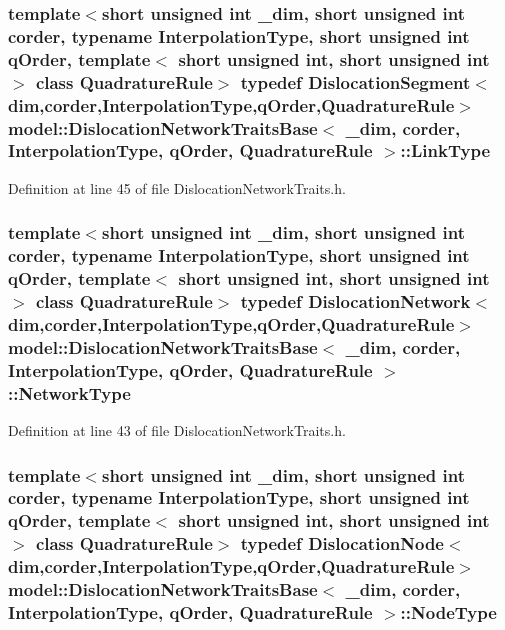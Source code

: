 \subsubsection[{Link\+Type}]{\setlength{\rightskip}{0pt plus 5cm}template$<$short unsigned int \+\_\+dim, short unsigned int corder, typename Interpolation\+Type, short unsigned int q\+Order, template$<$ short unsigned int, short unsigned int $>$ class Quadrature\+Rule$>$ typedef {\bf Dislocation\+Segment}$<${\bf dim},corder,Interpolation\+Type,q\+Order,Quadrature\+Rule$>$ {\bf model\+::\+Dislocation\+Network\+Traits\+Base}$<$ \+\_\+dim, corder, Interpolation\+Type, q\+Order, Quadrature\+Rule $>$\+::{\bf Link\+Type}}\label{structmodel_1_1_dislocation_network_traits_base_abf174d97083b39a2071a69f1dc5d079c}


Definition at line 45 of file Dislocation\+Network\+Traits.\+h.

\hypertarget{structmodel_1_1_dislocation_network_traits_base_ad1c4fef95e4639548d6371751f1ada53}{}
\subsubsection[{Network\+Type}]{\setlength{\rightskip}{0pt plus 5cm}template$<$short unsigned int \+\_\+dim, short unsigned int corder, typename Interpolation\+Type, short unsigned int q\+Order, template$<$ short unsigned int, short unsigned int $>$ class Quadrature\+Rule$>$ typedef {\bf Dislocation\+Network}$<${\bf dim},corder,Interpolation\+Type,q\+Order,Quadrature\+Rule$>$ {\bf model\+::\+Dislocation\+Network\+Traits\+Base}$<$ \+\_\+dim, corder, Interpolation\+Type, q\+Order, Quadrature\+Rule $>$\+::{\bf Network\+Type}}\label{structmodel_1_1_dislocation_network_traits_base_ad1c4fef95e4639548d6371751f1ada53}


Definition at line 43 of file Dislocation\+Network\+Traits.\+h.

\hypertarget{structmodel_1_1_dislocation_network_traits_base_a7e0bbc0b2e0f806678b7a1970cb85ec4}{}
\subsubsection[{Node\+Type}]{\setlength{\rightskip}{0pt plus 5cm}template$<$short unsigned int \+\_\+dim, short unsigned int corder, typename Interpolation\+Type, short unsigned int q\+Order, template$<$ short unsigned int, short unsigned int $>$ class Quadrature\+Rule$>$ typedef {\bf Dislocation\+Node}$<${\bf dim},corder,Interpolation\+Type,q\+Order,Quadrature\+Rule$>$ {\bf model\+::\+Dislocation\+Network\+Traits\+Base}$<$ \+\_\+dim, corder, Interpolation\+Type, q\+Order, Quadrature\+Rule $>$\+::{\bf Node\+Type}}\label{structmodel_1_1_dislocation_network_traits_base_a7e0bbc0b2e0f806678b7a1970cb85ec4}


